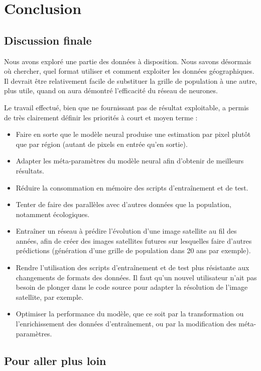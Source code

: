 \documentclass[a4paper, 11pt]{report}
\begin{document}
\chapter{Conclusion}
\section{Discussion finale}
Nous avons exploré une partie des données à disposition. Nous savons désormais où chercher, quel format utiliser et comment exploiter les données géographiques. Il devrait être relativement facile de substituer la grille de population à une autre, plus utile, quand on aura démontré l'efficacité du réseau de neurones.

Le travail effectué, bien que ne fournissant pas de résultat exploitable, a permis de très clairement définir les priorités à court et moyen terme :
\begin{itemize}
	\item Faire en sorte que le modèle neural produise une estimation par pixel plutôt que par région (autant de pixels en entrée qu'en sortie).
	\item Adapter les méta-paramètres du modèle neural afin d'obtenir de meilleurs résultats.
	\item Réduire la consommation en mémoire des scripts d'entraînement et de test.
	\item Tenter de faire des parallèles avec d'autres données que la population, notamment écologiques.
	\item Entraîner un réseau à prédire l'évolution d'une image satellite au fil des années, afin de créer des images satellites futures sur lesquelles faire d'autres prédictions (génération d'une grille de population dans 20 ans par exemple).
	\item Rendre l'utilisation des scripts d'entraînement et de test plus résistante aux changements de formats des données. Il faut qu'un nouvel utilisateur n'ait pas besoin de plonger dans le code source pour adapter la résolution de l'image satellite, par exemple.
	\item Optimiser la performance du modèle, que ce soit par la transformation ou l'enrichissement des données d'entraînement, ou par la modification des méta-paramètres.
\end{itemize}

\section{Pour aller plus loin}
\end{document}
